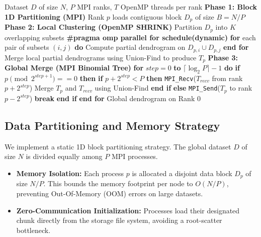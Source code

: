 \begin{algorithm}
\caption{Hybrid MPI+OpenMP Hierarchical Clustering}
\begin{algorithmic}[1]
\REQUIRE Dataset $D$ of size $N$, $P$ MPI ranks, $T$ OpenMP threads per rank
\STATE \textbf{Phase 1: Block 1D Partitioning (MPI)}
\STATE Rank $p$ loads contiguous block $D_p$ of size $B = N/P$
\STATE \textbf{Phase 2: Local Clustering (OpenMP SHRINK)}
\STATE Partition $D_p$ into $K$ overlapping subsets
\STATE \textbf{\#pragma omp parallel for schedule(dynamic)}
\STATE \textbf{for} each pair of subsets $(i, j)$ \textbf{do}
\STATE \quad Compute partial dendrogram on $D_{p,i} \cup D_{p,j}$
\STATE \textbf{end for}
\STATE Merge local partial dendrograms using Union-Find to produce $T_p$
\STATE \textbf{Phase 3: Global Merge (MPI Binomial Tree)}
\STATE \textbf{for} $step = 0$ \textbf{to} $\lceil \log_2 P \rceil - 1$ \textbf{do}
\STATE \quad \textbf{if} $p \pmod{2^{step+1}} == 0$ \textbf{then}
\STATE \quad \quad \textbf{if} $p + 2^{step} < P$ \textbf{then}
\STATE \quad \quad \quad \texttt{MPI\_Recv}($T_{recv}$ from rank $p + 2^{step}$)
\STATE \quad \quad \quad Merge $T_p$ and $T_{recv}$ using Union-Find
\STATE \quad \quad \textbf{end if}
\STATE \quad \textbf{else}
\STATE \quad \quad \texttt{MPI\_Send}($T_p$ to rank $p - 2^{step}$)
\STATE \quad \quad \textbf{break} 
\STATE \quad \textbf{end if}
\STATE \textbf{end for}
\RETURN Global dendrogram on Rank 0
\end{algorithmic}
\end{algorithm}

\subsection{Data Partitioning and Memory Strategy}
We implement a static 1D block partitioning strategy. The global dataset $D$ of size $N$ is divided equally among $P$ MPI processes.
\begin{itemize}
    \item \textbf{Memory Isolation:} Each process $p$ is allocated a disjoint data block $D_p$ of size $N/P$. This bounds the memory footprint per node to $O(N/P)$, preventing Out-Of-Memory (OOM) errors on large datasets.
    \item \textbf{Zero-Communication Initialization:} Processes load their designated chunk directly from the storage file system, avoiding a root-scatter bottleneck.
\end{itemize}

